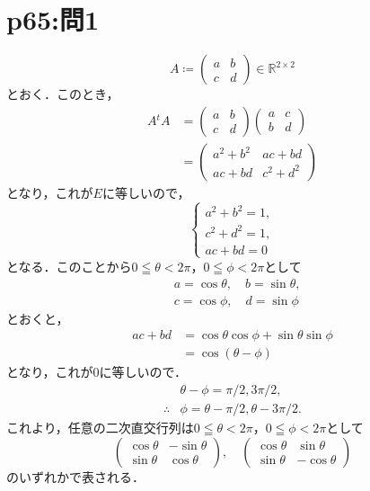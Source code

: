 \documentclass[a4paper,10pt,fleqn]{ltjsarticle}
\begin{document}
\section*{p65:問1}

\begin{tleftbar}
    \[
        A \coloneqq \begin{pmatrix} a & b \\ c & d\end{pmatrix} \in \mathbb{R}^{2 \times 2}
    \]
    とおく．このとき，
    \begin{align*}
        A {}^t A & = \begin{pmatrix} a & b \\ c & d \end{pmatrix} \begin{pmatrix} a & c \\ b & d\end{pmatrix} \\
                 & = \begin{pmatrix} a^2 +b^2 & ac+bd \\ ac+bd & c^2 + d^2 \end{pmatrix}
    \end{align*}
    となり，これが$E$に等しいので，
    \[
        \begin{cases}
            a^2 + b^2 =1 , \\
            c^2 + d^2 =1 , \\
            ac+bd =0
        \end{cases}
    \]
    となる．このことから$ 0 \leqq \theta < 2\pi $，$ 0 \leqq \phi < 2\pi$として
    \begin{align*}
         & a = \cos \theta , \quad b = \sin \theta, \\
         & c = \cos \phi , \quad d = \sin \phi
    \end{align*}
    とおくと，
    \begin{align*}
        ac+bd & = \cos \theta \cos \phi + \sin \theta \sin \phi \\
              & = \cos (\theta - \phi)
    \end{align*}
    となり，これが$0$に等しいので．
    \begin{align*}
                   & \theta -\phi = \pi /2 , 3\pi /2 ,         \\
        \therefore & \phi = \theta - \pi /2 , \theta - 3\pi/2.
    \end{align*}
    これより，任意の二次直交行列は$ 0 \leqq \theta < 2\pi $，$ 0 \leqq \phi < 2\pi$として
    \[
        \begin{pmatrix} \cos \theta & -\sin \theta \\ \sin \theta & \cos \theta \end{pmatrix},\quad \begin{pmatrix} \cos \theta & \sin \theta \\ \sin \theta & -\cos \theta \end{pmatrix}
    \]
    のいずれかで表される．
\end{tleftbar}
\end{document}
